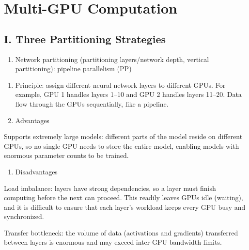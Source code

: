 \setcounter{section}{2}

\hypertarget{multi-gpu-computation}{%
\section{Multi-GPU Computation}\label{multi-gpu-computation}}

\hypertarget{i.-three-partitioning-strategies}{%
\subsection{I. Three Partitioning Strategies}\label{i.-three-partitioning-strategies}}

\begin{enumerate}
\def\labelenumi{\arabic{enumi}.}
\tightlist
\item
  Network partitioning (partitioning layers/network depth, vertical partitioning): pipeline parallelism (PP)
\end{enumerate}

\begin{enumerate}
\def\labelenumi{(\arabic{enumi})}
\item
  Principle: assign different neural network layers to different GPUs. For example, GPU 1 handles layers 1--10 and GPU 2 handles layers 11--20. Data flow through the GPUs sequentially, like a pipeline.
\item
  Advantages
\end{enumerate}

Supports extremely large models: different parts of the model reside on different GPUs, so no single GPU needs to store the entire model, enabling models with enormous parameter counts to be trained.

\begin{enumerate}
\def\labelenumi{(\arabic{enumi})}
\setcounter{enumi}{2}
\tightlist
\item
  Disadvantages
\end{enumerate}

Load imbalance: layers have strong dependencies, so a layer must finish computing before the next can proceed. This readily leaves GPUs idle (waiting), and it is difficult to ensure that each layer's workload keeps every GPU busy and synchronized.

Transfer bottleneck: the volume of data (activations and gradients) transferred between layers is enormous and may exceed inter-GPU bandwidth limits.


